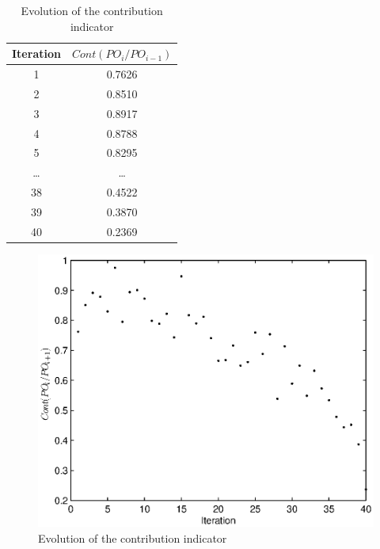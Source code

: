 \begin{table}[h!]
\begin{center}
\begin{tabular}{|c|c|}
\hline Iteration & $Cont(PO_i/PO_{i-1})$ \\ 
\hline 1 & 0.7626 \\ 
\hline 2 & 0.8510 \\ 
\hline 3 & 0.8917 \\ 
\hline 4 & 0.8788 \\ 
\hline 5 & 0.8295 \\ 
\hline \dots & \dots \\
\hline 38 & 0.4522 \\
\hline 39 & 0.3870 \\ 
\hline 40 & 0.2369 \\
\hline 
\end{tabular} 
\end{center}
\caption{Evolution of the contribution indicator}
\label{tab:contrib}
\end{table}

\begin{figure}[h!]
\begin{center}
\includegraphics[width=1\linewidth]{contrib2new.eps}
\end{center}
\vspace{-0.5cm}
\caption{Evolution of the contribution indicator}
\label{fig:contrib}
\end{figure}

